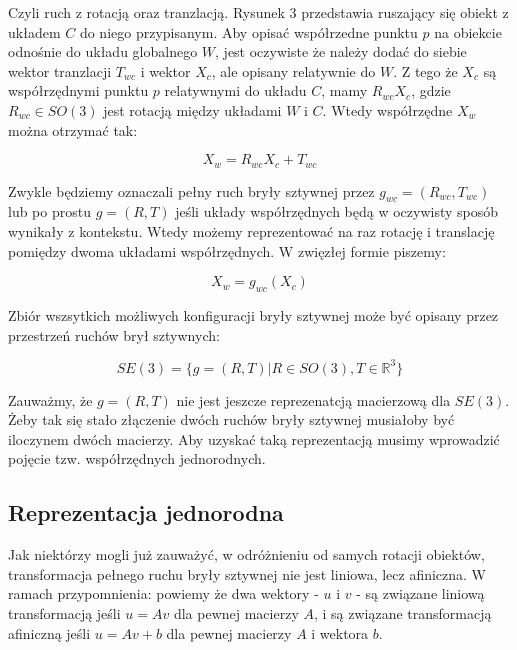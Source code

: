 \documentclass[a4paper,12pt]{article}
\newcommand{\RR}{\mathbb{R}^3}
\begin{document}
Czyli ruch z rotacją oraz tranzlacją. Rysunek 3 przedstawia ruszający się obiekt z układem $C$ do niego przypisanym. Aby opisać współrzedne punktu $p$ na obiekcie odnośnie do układu globalnego $W$, jest oczywiste że należy dodać do siebie wektor tranzlacji $T_{wc}$ i wektor $X_c$, ale opisany relatywnie do $W$. Z tego że $X_c$ są współrzędnymi punktu $p$ relatywnymi do układu $C$, mamy $R_{wc}X_c$, gdzie $R_{wc} \in SO(3)$ jest rotacją między układami $W$ i $C$. Wtedy współrzędne $X_w$ można otrzymać tak:

\begin{equation}
X_w = R_{wc}X_c + T_{wc}
\end{equation}

Zwykle będziemy oznaczali pełny ruch bryły sztywnej przez $g_{wc} = (R_{wc},T_{wc})$ lub po prostu $g = (R,T)$ jeśli układy współrzędnych będą w oczywisty sposób wynikały z kontekstu. Wtedy możemy reprezentować na raz rotację i translację pomiędzy dwoma układami współrzędnych. W zwięzłej formie piszemy:

\begin{equation}
X_w = g_{wc}(X_c)
\end{equation}

Zbiór wszsytkich możliwych konfiguracji bryły sztywnej może być opisany przez przestrzeń ruchów brył sztywnych:

\begin{equation}
SE(3) = \{ g = (R,T) | R \in SO(3), T \in \RR \}
\end{equation}

Zauważmy, że $g = (R,T)$ nie jest jeszcze reprezenatcją macierzową dla $SE(3)$. Żeby tak się stało złączenie dwóch ruchów bryły sztywnej musiałoby być iloczynem dwóch macierzy. Aby uzyskać taką reprezentacją musimy wprowadzić pojęcie tzw. współrzędnych jednorodnych.



\subsection{Reprezentacja jednorodna}


\indent \indent Jak niektórzy mogli już zauważyć, w odróżnieniu od samych rotacji obiektów, transformacja pełnego ruchu bryły sztywnej nie jest liniowa, lecz afiniczna. W ramach przypomnienia: powiemy że dwa wektory - $u$ i $v$ - są związane liniową transformacją jeśli $u = Av$ dla pewnej macierzy $A$, i są związane transformacją afiniczną jeśli $u = Av + b$ dla pewnej macierzy $A$ i wektora $b$.
\end{document}
